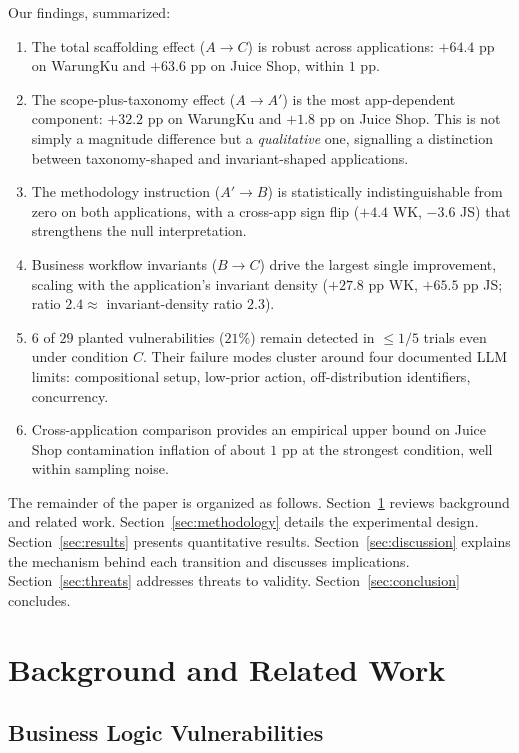 \documentclass[conference]{IEEEtran}
\begin{document}
Our findings, summarized:
\begin{enumerate}
    \item The total scaffolding effect ($A \to C$) is robust across applications: $+64.4$ pp on WarungKu and $+63.6$ pp on Juice Shop, within $1$ pp.
    \item The scope-plus-taxonomy effect ($A \to A'$) is the most app-dependent component: $+32.2$ pp on WarungKu and $+1.8$ pp on Juice Shop. This is not simply a magnitude difference but a \emph{qualitative} one, signalling a distinction between taxonomy-shaped and invariant-shaped applications.
    \item The methodology instruction ($A' \to B$) is statistically indistinguishable from zero on both applications, with a cross-app sign flip ($+4.4$ WK, $-3.6$ JS) that strengthens the null interpretation.
    \item Business workflow invariants ($B \to C$) drive the largest single improvement, scaling with the application's invariant density ($+27.8$ pp WK, $+65.5$ pp JS; ratio $2.4 \approx$ invariant-density ratio $2.3$).
    \item $6$ of $29$ planted vulnerabilities ($21\%$) remain detected in $\le 1/5$ trials even under condition $C$. Their failure modes cluster around four documented LLM limits: compositional setup, low-prior action, off-distribution identifiers, concurrency.
    \item Cross-application comparison provides an empirical upper bound on Juice Shop contamination inflation of about $1$ pp at the strongest condition, well within sampling noise.
\end{enumerate}

The remainder of the paper is organized as follows. Section~\ref{sec:related} reviews background and related work. Section~\ref{sec:methodology} details the experimental design. Section~\ref{sec:results} presents quantitative results. Section~\ref{sec:discussion} explains the mechanism behind each transition and discusses implications. Section~\ref{sec:threats} addresses threats to validity. Section~\ref{sec:conclusion} concludes.

\section{Background and Related Work}
\label{sec:related}

\subsection{Business Logic Vulnerabilities}
\end{document}
